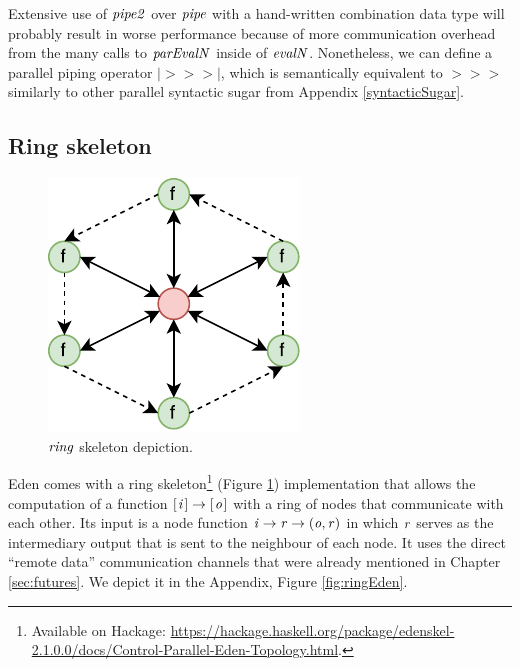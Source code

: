 \documentclass[paper=A4,twoside=true,openright,parskip=full,chapterprefix=true,headings=normal,bibliography=totoc,listof=totoc,titlepage=on,captions=tableabove,draft=false,british]{scrreprt}%
\renewcommand{\enquote}[1]{{``}#1{''}}
\begin{document}
Extensive use of \ensuremath{\Varid{pipe2}} over \ensuremath{\Varid{pipe}} with a hand-written combination
data type will probably result in worse performance because of more
communication overhead from the many calls to \ensuremath{\Varid{parEvalN}} inside of
\ensuremath{\Varid{evalN}}. Nonetheless, we can define a parallel piping operator
\ensuremath{\mathbin{|\!>\!\!>\!\!>\!|}}, which is semantically equivalent to \ensuremath{\mathbin{>\!\!>\!\!>}} similarly to other
parallel syntactic sugar from Appendix \ref{syntacticSugar}.

\hypertarget{ring-skeleton}{%
\subsection{Ring skeleton}\label{ring-skeleton}}

\label{sec:ring}

\begin{figure}
\centering
\includegraphics{src/img/ringImg.pdf}
\caption{\ensuremath{\Varid{ring}} skeleton depiction.\label{fig:ringImg}}
\end{figure}

Eden comes with a ring skeleton\footnote{Available on Hackage:
  \url{https://hackage.haskell.org/package/edenskel-2.1.0.0/docs/Control-Parallel-Eden-Topology.html}.}
(Figure \ref{fig:ringImg}) implementation that allows the computation of
a function \ensuremath{[\mskip1.5mu \Varid{i}\mskip1.5mu]\to [\mskip1.5mu \Varid{o}\mskip1.5mu]} with a ring of nodes that communicate with each
other. Its input is a node function \ensuremath{\Varid{i}\to \Varid{r}\to (\Varid{o},\Varid{r})} in which \ensuremath{\Varid{r}}
serves as the intermediary output that is sent to the neighbour of each
node. It uses the direct \enquote{remote data} communication channels
that were already mentioned in Chapter \ref{sec:futures}. We depict it
in the Appendix, Figure \ref{fig:ringEden}.
\end{document}

